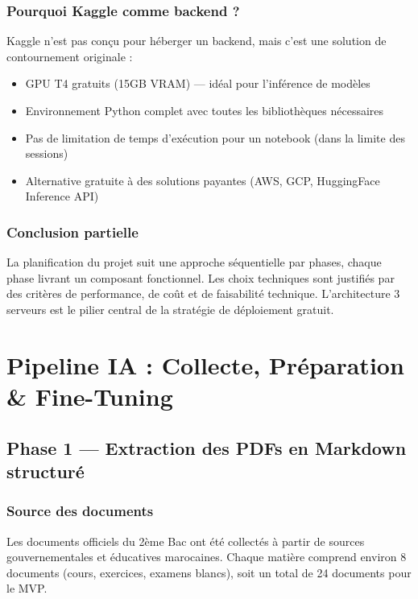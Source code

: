 \documentclass[12pt,a4paper]{report}
\begin{document}
\subsection{Pourquoi Kaggle comme backend ?}
Kaggle n'est pas conçu pour héberger un backend, mais c'est une solution de contournement originale :
\begin{itemize}
    \item GPU T4 gratuits (15GB VRAM) — idéal pour l'inférence de modèles
    \item Environnement Python complet avec toutes les bibliothèques nécessaires
    \item Pas de limitation de temps d'exécution pour un notebook (dans la limite des sessions)
    \item Alternative gratuite à des solutions payantes (AWS, GCP, HuggingFace Inference API)
\end{itemize}

\subsection*{Conclusion partielle}
La planification du projet suit une approche séquentielle par phases, chaque phase livrant un composant fonctionnel. Les choix techniques sont justifiés par des critères de performance, de coût et de faisabilité technique. L'architecture 3 serveurs est le pilier central de la stratégie de déploiement gratuit.

\chapter{Pipeline IA : Collecte, Préparation \& Fine-Tuning}

\section{Phase 1 — Extraction des PDFs en Markdown structuré}

\subsection{Source des documents}
Les documents officiels du 2ème Bac ont été collectés à partir de sources gouvernementales et éducatives marocaines. Chaque matière comprend environ 8 documents (cours, exercices, examens blancs), soit un total de 24 documents pour le MVP.
\end{document}
